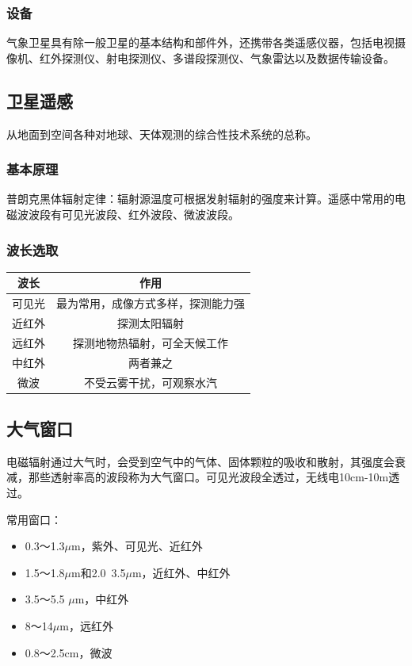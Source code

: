 \documentclass[UTF8,11pt]{ctexbook}
\begin{document}
\subsubsection{设备}

气象卫星具有除一般卫星的基本结构和部件外，还携带各类遥感仪器，包括电视摄像机、红外探测仪、射电探测仪、多谱段探测仪、气象雷达以及数据传输设备。

\subsection{卫星遥感}

从地面到空间各种对地球、天体观测的综合性技术系统的总称。

\subsubsection{基本原理}

普朗克黑体辐射定律：辐射源温度可根据发射辐射的强度来计算。遥感中常用的电磁波波段有可见光波段、红外波段、微波波段。

\subsubsection{波长选取}
\begin{table}[htbp]
    \centering
    \begin{tabular}{cc}
        \toprule
        波长 & 作用\\
        \midrule
        可见光 & 最为常用，成像方式多样，探测能力强\\
        近红外 & 探测太阳辐射\\
        远红外 & 探测地物热辐射，可全天候工作\\
        中红外 & 两者兼之\\
        微波 & 不受云雾干扰，可观察水汽\\
        \bottomrule
    \end{tabular}
\end{table}

\subsection{大气窗口}

电磁辐射通过大气时，会受到空气中的气体、固体颗粒的吸收和散射，其强度会衰减，那些透射率高的波段称为大气窗口。可见光波段全透过，无线电10cm-10m透过。

常用窗口：
\begin{itemize}
    \item 0.3～1.3\(\mu\)m，紫外、可见光、近红外
    \item 1.5～1.8\(\mu\)m和2.0~3.5\(\mu\)m，近红外、中红外
    \item 3.5～5.5 \(\mu\)m，中红外
    \item 8～14\(\mu\)m，远红外
    \item 0.8～2.5cm，微波
\end{itemize}
\end{document}
